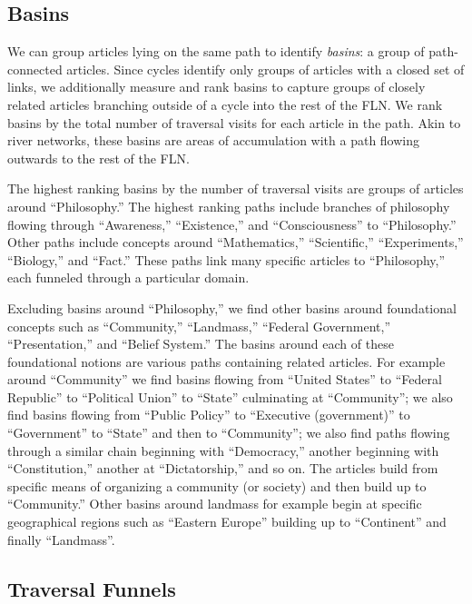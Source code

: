 \documentclass[11pt]{report}
\begin{document}
\subsection{Basins}

We can group articles lying on the same path to identify {\it basins}: 
a group of path-connected articles.
Since cycles identify only groups of articles with a closed set of links, 
we additionally measure and rank basins to capture groups of closely related
articles branching outside of a cycle into the rest of the FLN.
We rank basins by the total number of traversal visits for each article in the path. 
Akin to river networks, these basins are areas of accumulation with a path 
flowing outwards to the rest of the FLN.

The highest ranking basins by the number of traversal visits are groups of articles
around ``Philosophy.'' 
The highest ranking paths include branches of philosophy flowing through 
``Awareness,'' ``Existence,'' and ``Consciousness'' to ``Philosophy.'' Other paths
include concepts around ``Mathematics,'' ``Scientific,'' ``Experiments,'' 
``Biology,'' and ``Fact.''
These paths link many specific articles to ``Philosophy,'' each funneled through a particular domain.

Excluding basins around ``Philosophy,'' we find other basins around 
foundational concepts such as ``Community,'' ``Landmass,'' ``Federal Government,'' 
``Presentation,'' and ``Belief System.'' 
The basins around each of these foundational notions are 
various paths containing related articles. For example around 
``Community'' we find basins
flowing from ``United States'' to ``Federal Republic'' to ``Political Union'' to ``State'' culminating at ``Community''; we also find basins flowing from 
``Public Policy'' to ``Executive (government)'' to ``Government'' to ``State'' and then 
to ``Community''; we also find paths flowing through a similar chain beginning
with ``Democracy,'' another beginning with ``Constitution,'' another at 
``Dictatorship,'' and so on. The articles build from specific means of organizing
a community (or society) and then build up to ``Community.'' 
Other basins around landmass for example begin at specific geographical regions
such as ``Eastern Europe'' building up to ``Continent'' and finally ``Landmass''.


\subsection{Traversal Funnels}
\end{document}
